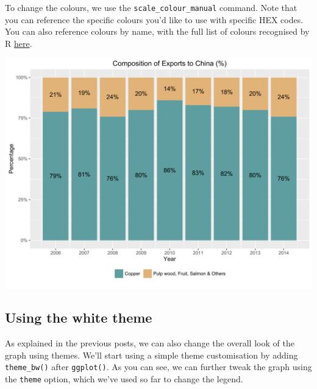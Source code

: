 \documentclass[]{article}
\newenvironment{Shaded}{\begin{snugshade}}{\end{snugshade}}
\newcommand{\KeywordTok}[1]{\textcolor[rgb]{0.13,0.29,0.53}{\textbf{{#1}}}}
\newcommand{\DataTypeTok}[1]{\textcolor[rgb]{0.13,0.29,0.53}{{#1}}}
\newcommand{\StringTok}[1]{\textcolor[rgb]{0.31,0.60,0.02}{{#1}}}
\newcommand{\NormalTok}[1]{{#1}}
\begin{document}
To change the colours, we use the \texttt{scale\_colour\_manual}
command. Note that you can reference the specific colours you'd like to
use with specific HEX codes. You can also reference colours by name,
with the full list of colours recognised by R
\href{http://www.stat.columbia.edu/~tzheng/files/Rcolor.pdf}{here}.

\begin{Shaded}
\end{Shaded}

\begin{center}\includegraphics{0_all_posts_pdf/stacked_8-1} \end{center}

\subsection{Using the white theme}\label{using-the-white-theme-3}

As explained in the previous posts, we can also change the overall look
of the graph using themes. We'll start using a simple theme
customisation by adding \texttt{theme\_bw()} after \texttt{ggplot()}. As
you can see, we can further tweak the graph using the \texttt{theme}
option, which we've used so far to change the legend.
\end{document}
